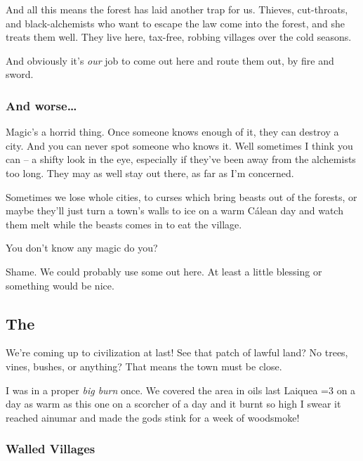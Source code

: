 \begin{multicols}{2}
\begin{exampletext}
  And all this means the forest has laid another trap for us.
  Thieves, cut-throats, and black-alchemists who want to escape the law come into the forest, and she treats them well.
  They live here, tax-free, robbing villages over the cold seasons.

  And obviously it's \emph{our} job to come out here and route them out, by fire and sword.


  \subsubsection*{And worse\ldots}

  Magic's a horrid thing.
  Once someone knows enough of it, they can destroy a city.
  And you can never spot someone who knows it.
  Well sometimes I think you can -- a shifty look in the eye, especially if they've been away from the \gls{alchemists} too long.
  They may as well stay out there, as far as I'm concerned.

  Sometimes we lose whole cities, to curses which bring beasts out of the forests, or maybe they'll just turn a town's walls to ice on a warm C\'alean day and watch them melt while the beasts comes in to eat the village.

  You don't know any magic do you?

  Shame.
  We could probably use some out here.
  At least a little blessing or something would be nice.
\end{exampletext}

\subsection*{The }

\begin{exampletext}
  We're coming up to civilization at last!
  See that patch of lawful land?
  No trees, vines, bushes, or anything?
  That means the town must be close.

  I was in a proper \textit{big burn} once.
  We covered the area in oils last Laiquea \ifnum\value{temperature}=3 on a day as warm as this one \else on a scorcher of a day \fi and it burnt so high I swear it reached \gls{ainumar} and made the gods stink for a week of woodsmoke!

  \subsubsection*{Walled Villages}


\end{exampletext}
\end{multicols}
